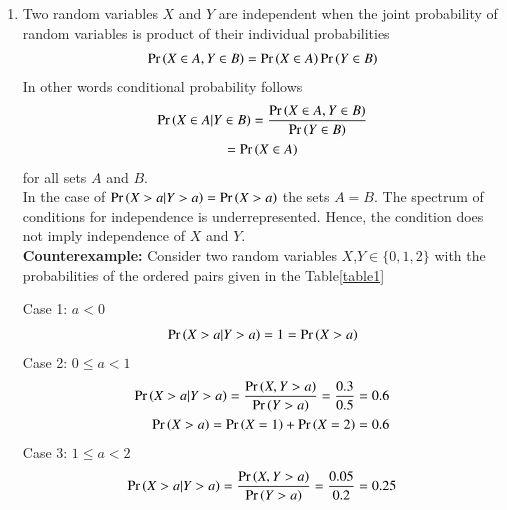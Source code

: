 \documentclass[journal,12pt,twocolumn]{IEEEtran}
\begin{document}
\begin{enumerate}
    \item Two random variables $X$ and $Y$ are independent when the joint probability of random variables is product of their individual probabilities
    \begin{align}
        \label{eq1} \Pr\left(X\in A,Y \in B\right)=\Pr\left(X \in A\right)\Pr\left(Y \in B\right)
    \end{align}
    In other words conditional probability follows
    \begin{multline}
        \Pr\left(X\in A|Y \in B\right)=\frac{\Pr\left(X \in A, Y \in B\right)}{\Pr\left(Y \in B\right)}\\=\Pr\left(X \in A\right)
    \end{multline}
    for all sets $A$ and $B$. \\
    In the case of $\Pr\left(X>a|Y>a\right)=\Pr\left(X>a\right)$ the sets $A=B$. The spectrum of conditions for independence is underrepresented. Hence, the condition does not imply independence of $X$ and $Y$.\\
    \textbf{Counterexample:} Consider two random variables $X$,$Y \in \{0,1,2\}$ with the probabilities of the ordered pairs  given in the Table\ref{table1}
    \begin{center}
    \begin{table}[H]
    \centering
    \caption{}
    \label{table1}
    \end{table}
    \end{center}
    Case 1: $a<0$
    \begin{align}
        \Pr\left(X>a|Y>a\right)=1=\Pr\left(X>a\right)
    \end{align}
    Case 2: $0\leq a <1$
    \begin{align}
        \Pr\left(X>a|Y>a\right)=\frac{\Pr\left(X,Y>a\right)}{\Pr\left(Y>a\right)}=\frac{0.3}{0.5}=0.6\\
        \Pr\left(X>a\right)=\Pr\left(X=1\right)+\Pr\left(X=2\right)=0.6
    \end{align}
    Case 3: $1\leq a <2$
    \begin{align}
        \pr{X>a|Y>a}=\frac{\pr{X,Y>a}}{\pr{Y>a}}=\frac{0.05}{0.2}=0.25\\

\end{align}
\end{enumerate}
\end{document}
